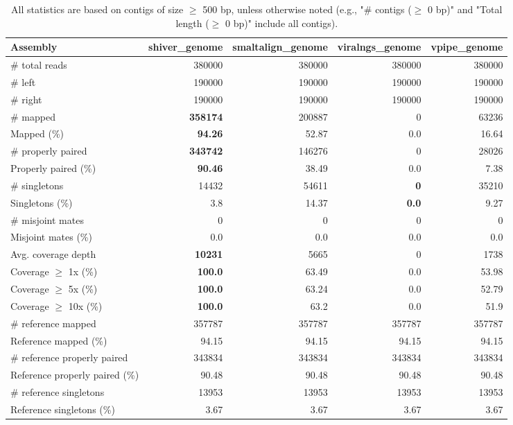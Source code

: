 \documentclass[12pt,a4paper]{article}
\begin{document}
\begin{table}[ht]
\begin{center}
\caption{All statistics are based on contigs of size $\geq$ 500 bp, unless otherwise noted (e.g., "\# contigs ($\geq$ 0 bp)" and "Total length ($\geq$ 0 bp)" include all contigs).}
\begin{tabular}{|l*{4}{|r}|}
\hline
Assembly & shiver\_genome & smaltalign\_genome & viralngs\_genome & vpipe\_genome \\ \hline
\# total reads & 380000 & 380000 & 380000 & 380000 \\ \hline
\# left & 190000 & 190000 & 190000 & 190000 \\ \hline
\# right & 190000 & 190000 & 190000 & 190000 \\ \hline
\# mapped & {\bf 358174} & 200887 & 0 & 63236 \\ \hline
Mapped (\%) & {\bf 94.26} & 52.87 & 0.0 & 16.64 \\ \hline
\# properly paired & {\bf 343742} & 146276 & 0 & 28026 \\ \hline
Properly paired (\%) & {\bf 90.46} & 38.49 & 0.0 & 7.38 \\ \hline
\# singletons & 14432 & 54611 & {\bf 0} & 35210 \\ \hline
Singletons (\%) & 3.8 & 14.37 & {\bf 0.0} & 9.27 \\ \hline
\# misjoint mates & 0 & 0 & 0 & 0 \\ \hline
Misjoint mates (\%) & 0.0 & 0.0 & 0.0 & 0.0 \\ \hline
Avg. coverage depth & {\bf 10231} & 5665 & 0 & 1738 \\ \hline
Coverage $\geq$ 1x (\%) & {\bf 100.0} & 63.49 & 0.0 & 53.98 \\ \hline
Coverage $\geq$ 5x (\%) & {\bf 100.0} & 63.24 & 0.0 & 52.79 \\ \hline
Coverage $\geq$ 10x (\%) & {\bf 100.0} & 63.2 & 0.0 & 51.9 \\ \hline
\# reference mapped & 357787 & 357787 & 357787 & 357787 \\ \hline
Reference mapped (\%) & 94.15 & 94.15 & 94.15 & 94.15 \\ \hline
\# reference properly paired & 343834 & 343834 & 343834 & 343834 \\ \hline
Reference properly paired (\%) & 90.48 & 90.48 & 90.48 & 90.48 \\ \hline
\# reference singletons & 13953 & 13953 & 13953 & 13953 \\ \hline
Reference singletons (\%) & 3.67 & 3.67 & 3.67 & 3.67 \\ \hline

\end{tabular}
\end{center}
\end{table}
\end{document}
